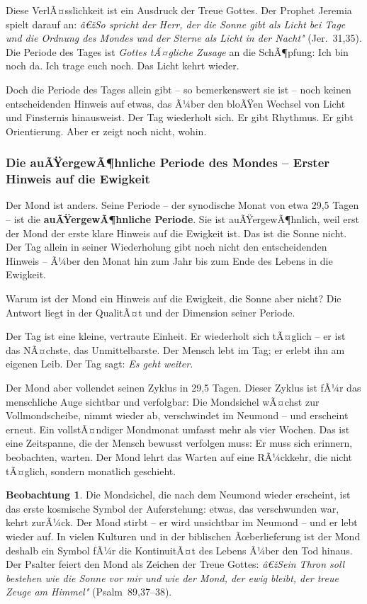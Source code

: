 ﻿\documentclass[a4paper,12pt]{article}
\theoremstyle{definition}
\newtheorem{observation}{Beobachtung}[section]
\begin{document}
Diese VerlÃ¤sslichkeit ist ein Ausdruck der Treue Gottes. Der Prophet Jeremia spielt
darauf an: \textit{â€žSo spricht der Herr, der die Sonne gibt als Licht bei Tage und
	die Ordnung des Mondes und der Sterne als Licht in der Nacht"}
(Jer.~31,35). Die Periode des Tages ist \textit{Gottes tÃ¤gliche Zusage} an die
SchÃ¶pfung: Ich bin noch da. Ich trage euch noch. Das Licht kehrt wieder.

Doch die Periode des Tages allein gibt -- so bemerkenswert sie ist -- noch keinen
entscheidenden Hinweis auf etwas, das Ã¼ber den bloÃŸen Wechsel von Licht und
Finsternis hinausweist. Der Tag wiederholt sich. Er gibt Rhythmus. Er gibt
Orientierung. Aber er zeigt noch nicht, wohin.

\subsubsection{Die auÃŸergewÃ¶hnliche Periode des Mondes -- Erster Hinweis auf die Ewigkeit}

Der Mond ist anders. Seine Periode -- der synodische Monat von etwa 29,5 Tagen --
ist die \textbf{auÃŸergewÃ¶hnliche Periode}. Sie ist auÃŸergewÃ¶hnlich, weil erst
der Mond der erste klare Hinweis auf die Ewigkeit ist. Das ist die Sonne nicht.
Der Tag allein in seiner Wiederholung gibt noch nicht den entscheidenden Hinweis
-- Ã¼ber den Monat hin zum Jahr bis zum Ende des Lebens in die Ewigkeit.

Warum ist der Mond ein Hinweis auf die Ewigkeit, die Sonne aber nicht? Die
Antwort liegt in der QualitÃ¤t und der Dimension seiner Periode.

Der Tag ist eine kleine, vertraute Einheit. Er wiederholt sich tÃ¤glich -- er ist
das NÃ¤chste, das Unmittelbarste. Der Mensch lebt im Tag; er erlebt ihn am eigenen
Leib. Der Tag sagt: \textit{Es geht weiter.}

Der Mond aber vollendet seinen Zyklus in 29,5 Tagen. Dieser Zyklus ist fÃ¼r das
menschliche Auge sichtbar und verfolgbar: Die Mondsichel wÃ¤chst zur Vollmond\-scheibe,
nimmt wieder ab, verschwindet im Neumond -- und erscheint erneut. Ein vollstÃ¤ndiger
Mondmonat umfasst mehr als vier Wochen. Das ist eine Zeitspanne, die der Mensch
bewusst verfolgen muss: Er muss sich erinnern, beobachten, warten. Der Mond lehrt
das Warten auf eine RÃ¼ckkehr, die nicht tÃ¤glich, sondern monatlich geschieht.

\begin{observation}
	Die Mondsichel, die nach dem Neumond wieder erscheint, ist das erste kosmische
	Symbol der Auferstehung: etwas, das verschwunden war, kehrt zurÃ¼ck. Der Mond
	stirbt -- er wird unsichtbar im Neumond -- und er lebt wieder auf. In vielen
	Kulturen und in der biblischen Ãœberlieferung ist der Mond deshalb ein Symbol
	fÃ¼r die KontinuitÃ¤t des Lebens Ã¼ber den Tod hinaus. Der Psalter feiert den
	Mond als Zeichen der Treue Gottes: \textit{â€žSein Thron soll bestehen wie die
		Sonne vor mir und wie der Mond, der ewig bleibt, der treue Zeuge am Himmel"}
	(Psalm~89,37--38).
\end{observation}
\end{document}
